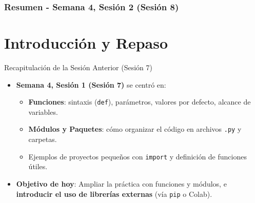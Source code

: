 \documentclass[10pt]{beamer}
\begin{document}
\myfront{}

\begin{frame}
  \titlepage
\end{frame}

\begin{frame}
  \frametitle{Resumen - Semana 4, Sesión 2 (Sesión 8)}
  \tableofcontents
\end{frame}


\section{Introducción y Repaso}

\begin{frame}{Recapitulación de la Sesión Anterior (Sesión 7)}
  \begin{itemize}
    \item \textbf{Semana 4, Sesión 1 (Sesión 7)} se centró en:
      \begin{itemize}
        \item \textbf{Funciones}: sintaxis (\texttt{def}), parámetros, valores por defecto, alcance de variables.
        \item \textbf{Módulos y Paquetes}: cómo organizar el código en archivos \texttt{.py} y carpetas.
        \item Ejemplos de proyectos pequeños con \texttt{import} y definición de funciones útiles.
      \end{itemize}
    \item \textbf{Objetivo de hoy}: Ampliar la práctica con funciones y módulos, e \textbf{introducir el uso de librerías externas} (vía \texttt{pip} o Colab).
  \end{itemize}
\end{frame}
\end{document}
